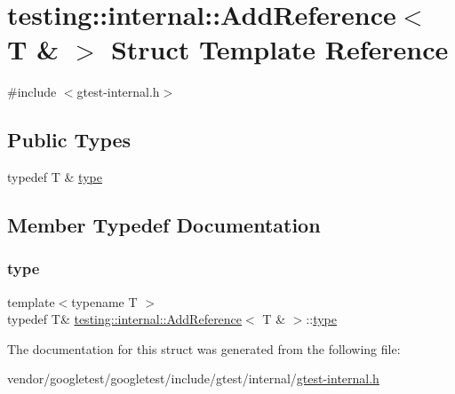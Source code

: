 \hypertarget{structtesting_1_1internal_1_1_add_reference_3_01_t_01_6_01_4}{}\section{testing\+:\+:internal\+:\+:Add\+Reference$<$ T \& $>$ Struct Template Reference}
\label{structtesting_1_1internal_1_1_add_reference_3_01_t_01_6_01_4}


{\ttfamily \#include $<$gtest-\/internal.\+h$>$}

\subsection*{Public Types}
\begin{DoxyCompactItemize}
\item 
typedef T \& \hyperlink{structtesting_1_1internal_1_1_add_reference_3_01_t_01_6_01_4_a93c064cdcdaced0abd167258425e57af}{type}
\end{DoxyCompactItemize}


\subsection{Member Typedef Documentation}
\mbox{\label{structtesting_1_1internal_1_1_add_reference_3_01_t_01_6_01_4_a93c064cdcdaced0abd167258425e57af}} 
\subsubsection{\texorpdfstring{type}{type}}
{\footnotesize\ttfamily template$<$typename T $>$ \\
typedef T\& \hyperlink{structtesting_1_1internal_1_1_add_reference}{testing\+::internal\+::\+Add\+Reference}$<$ T \& $>$\+::\hyperlink{structtesting_1_1internal_1_1_add_reference_3_01_t_01_6_01_4_a93c064cdcdaced0abd167258425e57af}{type}}



The documentation for this struct was generated from the following file\+:\begin{DoxyCompactItemize}
\item 
vendor/googletest/googletest/include/gtest/internal/\hyperlink{gtest-internal_8h}{gtest-\/internal.\+h}\end{DoxyCompactItemize}
